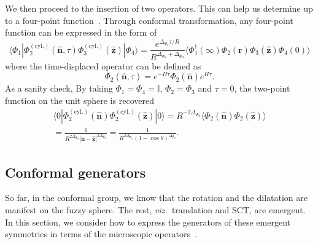 \documentclass{timesjhep}
\begin{document}
We then proceed to the insertion of two operators. This can help us determine up to a four-point function~\cite{Han2023Jun}. Through conformal transformation, any four-point function can be expressed in the form of 
\begin{equation}
    \langle\Phi_1|\Phi^{\mathrm{(cyl.)}}_2(\hat{\mathbf{n}},\tau)\Phi^{\mathrm{(cyl.)}}_3(\hat{\mathbf{z}})|\Phi_4\rangle=\frac{e^{\Delta_{\Phi_2}\tau/R}}{R^{\Delta_{\Phi_2}+\Delta_{\Phi_3}}}\langle\Phi_1^\dagger(\infty)\Phi_2(\mathbf{r})\Phi_3(\hat{\mathbf{z}})\Phi_4(0)\rangle
\end{equation} 
where the time-displaced operator can be defined as
\begin{equation}
    \Phi_2(\hat{\mathbf{n}},\tau)=e^{-H\tau}\Phi_2(\hat{\mathbf{n}})e^{H\tau}.
\end{equation} 
As a sanity check, By taking $\Phi_1=\Phi_4=\mathbb{I}$, $\Phi_2=\Phi_3$ and $\tau=0$, the two-point function on the unit sphere is recovered 
\begin{multline}
    \langle0|\Phi^{\mathrm{(cyl.)}}_2(\hat{\mathbf{n}})\Phi^{\mathrm{(cyl.)}}_2(\hat{\mathbf{z}})|0\rangle=R^{-2\Delta_{\Phi_2}}\langle\Phi_2(\hat{\mathbf{n}})\Phi_2(\hat{\mathbf{z}})\rangle\\=\frac{1}{R^{2\Delta_{\Phi_2}}|\hat{\mathbf{n}}-\hat{\mathbf{z}}|^{2\Delta_{\Phi_2}}}=\frac{1}{R^{2\Delta_{\Phi_2}}(1-\cos\theta)^{\Delta_{\Phi_2}}}.
\end{multline}

\subsection{Conformal generators}
\label{sec:construct_gen}

So far, in the conformal group, we know that the rotation and the dilatation are manifest on the fuzzy sphere. The rest, \textit{viz.}~translation and SCT, are emergent. In this section, we consider how to express the generators of these emergent symmetries in terms of the microscopic operators~\cite{Fardelli2024,Fan2024}. 
\end{document}
